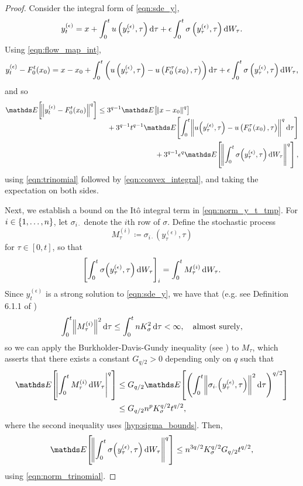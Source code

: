 \begin{proof}
	Consider the integral form of \cref{eqn:sde_y},
	\[
		y_t^{(\epsilon)} = x + \int_0^t{u\left(y_\tau^{(\epsilon)}, \tau\right)\dif\tau} + \epsilon\int_0^t{\sigma\left(y_\tau^{(\epsilon)}, \tau\right)\dif W_\tau}.
	\]
	Using \cref{eqn:flow_map_int},
	\[
		y_t^{(\epsilon)} - F_0^t\!\left(x_0\right) = x - x_0 + \int_0^{t}{\left(u\left(y_\tau^{(\epsilon)}, \tau\right) - u\left(F_0^{\tau}\!\left(x_0\right), \tau\right)\right)\dif\tau} + \epsilon\int_0^t{\sigma\left(y_\tau^{(\epsilon)}, \tau\right)\dif W_\tau},
	\]
	and so
	\begin{equation}
		\avg{\norm{y_t^{(\epsilon)} - F_0^t\!\left(x_0\right)}^q} \leq \begin{multlined}[t]
			3^{q-1}\avg{\norm{x - x_0}^q} \\
			+ 3^{q-1}t^{q-1}\avg{\int_0^{t}{\norm{u\!\left(y_\tau^{(\epsilon)}, \tau\right) - u\left(F_0^{\tau}\!\left(x_0\right), \tau\right)}^q\dif\tau}} \\
			+ 3^{q-1}\epsilon^q\avg{\norm{\int_0^t{\sigma\!\left(y_\tau^{(\epsilon)}, \tau\right)\dif W_\tau}}^q},
		\end{multlined}
		\label{eqn:norm_y_t_tmp}
	\end{equation}
	using \cref{eqn:trinomial} followed by \cref{eqn:convex_integral}, and taking the expectation on both sides.

	Next, we establish a bound on the It\^o integral term in \cref{eqn:norm_y_t_tmp}.
	For \(i \in \set{1,\hdots,n}\), let \(\sigma_{i\cdot}\) denote the \(i\)th row of \(\sigma\).
	Define the stochastic process
	\[
		M_\tau^{(i)} \coloneqq \sigma_{i\cdot}\!\left(y_\tau^{(\epsilon)}, \tau\right)
	\]
	for \(\tau \in [0,t]\), so that
	\[
		\left[\int_0^t{\sigma\!\left(y_\tau^{(\epsilon)}, \tau\right)\dif W_\tau}\right]_i = \int_0^t{M_\tau^{(i)}\dif W_\tau}.
	\]
	Since \(y_t^{(\epsilon)}\) is a strong solution to \cref{eqn:sde_y}, we have that (e.g. see Definition 6.1.1 of \cite{KallianpurSundar_2014_StochasticAnalysisDiffusion})
	\[
		\int_0^t{\norm{M_\tau^{(i)}}^2\dif\tau} \leq \int_0^t{nK_\sigma^2\dif\tau} < \infty, \quad \text{almost surely},
	\]
	so we can apply the Burkholder-Davis-Gundy inequality (see ) to \(M_\tau\), which asserts that there exists a constant \(G_{q/2} > 0\) depending only on \(q\) such that
	\begin{align*}
		\avg{\abs{\int_0^t{M_\tau^{(i)}\dif W_\tau}}^{q}} & \leq G_{q/2} \avg{\left(\int_{0}^t{\norm{\sigma_{i\cdot}\!\left(y_\tau^{(\epsilon)}, \tau\right)}^2\dif\tau}\right)^{q/2}} \\
		                                                  & \leq G_{q/2} n^p K_{\sigma}^{q/2} t^{q/2},
	\end{align*}
	where the second inequality uses \ref{hyp:sigma_bounds}.
	Then,
	\begin{equation}
		\avg{\norm{\int_0^t{\sigma\!\left(y_\tau^{(\epsilon)}, \tau\right)\dif W_\tau}}^{q}} \leq n^{3q/2} K_\sigma^{q/2} G_{q/2} t^{q/2},
		\label{eqn:z_sigma_bound}
	\end{equation}
	using \cref{eqn:norm_trinomial}.


\end{proof}
